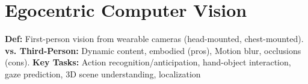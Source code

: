 \section{Egocentric Computer Vision}

\textbf{Def:} First-person vision from wearable cameras (head-mounted, chest-mounted). \textbf{vs. Third-Person:} Dynamic content, embodied (pros), Motion blur, occlusions (cons).
\textbf{Key Tasks:} Action recognition/anticipation, hand-object interaction, gaze prediction, 3D scene understanding, localization